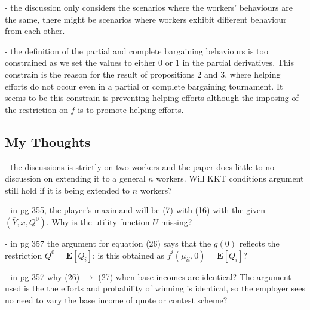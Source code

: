 \documentclass[a4paper,10pt,leqno]{article}
\theoremstyle{definition}
\begin{document}
- the discussion only considers the scenarios where the workers' behaviours are the same, there might be scenarios where workers exhibit different behaviour from each other.

- the definition of the partial and complete bargaining behaviours is too constrained as we set the values to either 0 or 1 in the partial derivatives. This constrain is the reason for the result of propositions 2 and 3, where helping efforts do not occur even in a partial or complete bargaining tournament.  It seems to be this constrain is preventing  helping efforts although the imposing of the restriction on $f$ is to promote helping efforts.






\subsection*{\sffamily My Thoughts}
- the discussions is strictly on two workers and the paper does little to no discussion on extending it to a general $n$ workers. Will KKT conditions argument still hold if it is being extended to $n$ workers?


- in pg 355, the player's maximand will be (7) with (16) with the given $(\overline{Y},x,Q^0)$. Why is the utility function $U$ missing? 

- in pg 357 the argument for equation (26) says that the $g(0)$ reflects the restriction $Q^0=\mathbf{E}[Q_i]$; is this obtained as $f^i(\mu_{ii},0)=\mathbf{E}[Q_i]$?

- in pg 357 why (26) $\to$ (27) when base incomes are identical? The argument used is the the efforts and probability of winning is identical, so the employer sees no need to vary the base income of quote or contest scheme?

 

\end{document}
